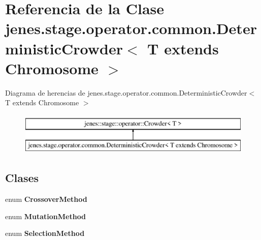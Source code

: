 \hypertarget{classjenes_1_1stage_1_1operator_1_1common_1_1_deterministic_crowder_3_01_t_01extends_01_chromosome_01_4}{\section{Referencia de la Clase jenes.\-stage.\-operator.\-common.\-Deterministic\-Crowder$<$ T extends Chromosome $>$}
\label{classjenes_1_1stage_1_1operator_1_1common_1_1_deterministic_crowder_3_01_t_01extends_01_chromosome_01_4}
}
Diagrama de herencias de jenes.\-stage.\-operator.\-common.\-Deterministic\-Crowder$<$ T extends Chromosome $>$\begin{figure}[H]
\begin{center}
\leavevmode
\includegraphics[height=2.000000cm]{classjenes_1_1stage_1_1operator_1_1common_1_1_deterministic_crowder_3_01_t_01extends_01_chromosome_01_4}
\end{center}
\end{figure}
\subsection*{Clases}
\begin{DoxyCompactItemize}
\item 
enum {\bfseries Crossover\-Method}
\item 
enum {\bfseries Mutation\-Method}
\item 
enum {\bfseries Selection\-Method}
\end{DoxyCompactItemize}
